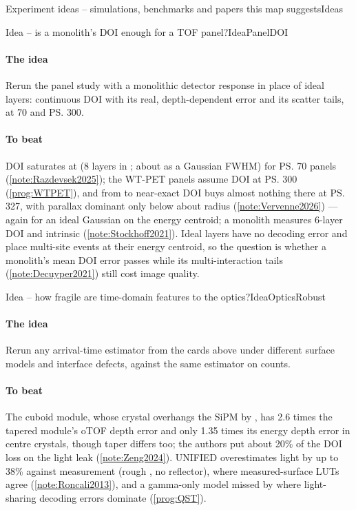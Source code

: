 \begin{programnote}{Experiment ideas -- simulations, benchmarks and papers this map suggests}{Ideas}
\begin{papernote}{Idea -- is a monolith's DOI enough for a TOF panel?}{IdeaPanelDOI}

\paragraph{The idea}
Rerun the panel study with a monolithic detector response in place of ideal
layers: continuous DOI with its real, depth-dependent error and its scatter
tails, at 70 and \ps{300}.

\paragraph{To beat}
DOI saturates at  (8 layers in ; about  as a
Gaussian FWHM) for \ps{70} panels (\ref{note:Razdevsek2025}); the WT-PET panels assume  DOI at \ps{300}
(\ref{prog:WTPET}), and from  to near-exact DOI buys almost nothing there at \ps{327}, with parallax
dominant only below about  radius (\ref{note:Vervenne2026}) --- again for an ideal Gaussian on the
energy centroid; a  monolith measures 6-layer DOI and
 intrinsic (\ref{note:Stockhoff2021}). Ideal layers have no decoding error and place multi-site events at their
energy centroid, so the question is whether a monolith's mean DOI error passes 
while its multi-interaction tails (\ref{note:Decuyper2021}) still cost image
quality.
\end{papernote}

\begin{papernote}{Idea -- how fragile are time-domain features to the optics?}{IdeaOpticsRobust}
\paragraph{The idea}
Rerun any arrival-time estimator from the cards above under different surface
models and interface defects, against the same estimator on counts.

\paragraph{To beat}
The  cuboid module, whose crystal overhangs the SiPM by , has
2.6 times the tapered module's oTOF depth error and only 1.35 times its energy
depth error in centre crystals, though taper differs too; the authors put about
20\% of the DOI loss on the light leak (\ref{note:Zeng2024}). UNIFIED
overestimates light by up to 38\% against measurement (rough
, no reflector), where measured-surface LUTs agree
(\ref{note:Roncali2013}),
and a gamma-only model missed by  where light-sharing decoding errors
dominate (\ref{prog:QST}).
\end{papernote}


\end{programnote}
